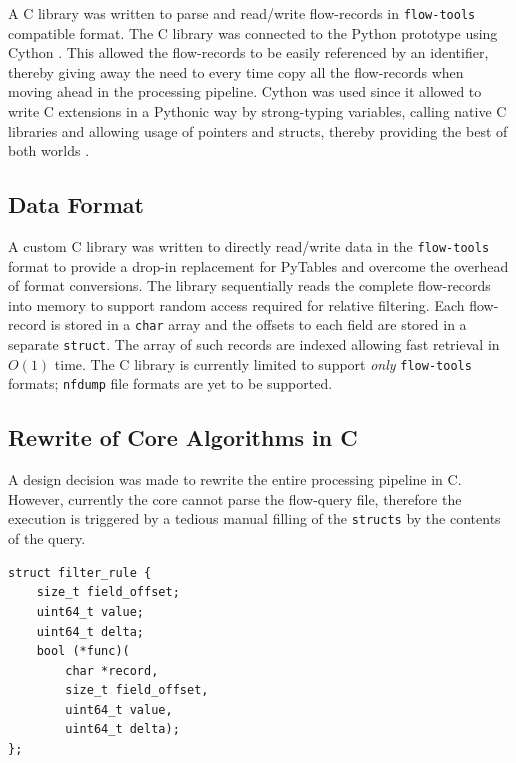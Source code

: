 A C library was written to parse and read/write flow-records in \texttt{flow-tools} compatible format. The C library was connected to the Python prototype using Cython \cite{dseljebotn:2009}\cite{wilbers:2009}. This allowed the flow-records to be easily referenced by an identifier, thereby giving away the need to every time copy all the flow-records when moving ahead in the processing pipeline. Cython was used since it allowed to write C extensions in a Pythonic way by strong-typing variables, calling native C libraries and allowing usage of pointers and structs, thereby providing the best of both worlds \cite{sbehnel:2011}. 

\subsection{Data Format}\label{subsec:data-format}
A custom C library was written to directly read/write data in the \texttt{flow-tools} format to provide a drop-in replacement for PyTables and overcome the overhead of format conversions. The library sequentially reads the complete flow-records into memory to support random access required for relative filtering. Each flow-record is stored in a \texttt{char} array and the offsets to each field are stored in a separate \texttt{struct}. The array of such records are indexed allowing fast retrieval in $O(1)$ time. The C library is currently limited to support \emph{only} \texttt{flow-tools} formats; \texttt{nfdump} file formats are yet to be supported.

\subsection{Rewrite of Core Algorithms in C}\label{subsec:core-alg-c}
A design decision was made to rewrite the entire processing pipeline in C. However, currently the core cannot parse the flow-query file, therefore the execution is triggered by a tedious manual filling of the \texttt{structs} by the contents of the query. 

\begin{lstlisting}
struct filter_rule {
	size_t field_offset;
	uint64_t value;
	uint64_t delta;
	bool (*func)(
		char *record,
		size_t field_offset,
		uint64_t value,
		uint64_t delta);
};
\end{lstlisting}

